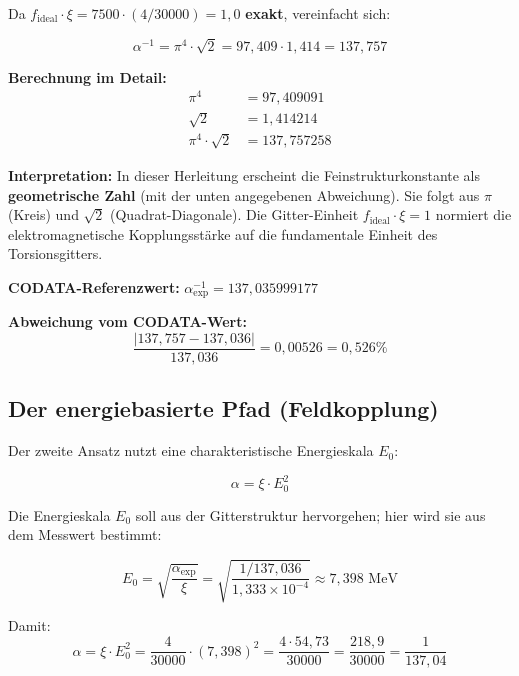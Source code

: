 	Da \(f_{\text{ideal}} \cdot \xi = 7500 \cdot (4/30000) = 1{,}0\) \textbf{exakt}, vereinfacht sich:
	
	\begin{equation}
		\alpha^{-1} = \pi^4 \cdot \sqrt{2} = 97{,}409 \cdot 1{,}414 = 137{,}757
	\end{equation}
	
	\textbf{Berechnung im Detail:}
	\begin{align}
		\pi^4 &= 97{,}409091 \\
		\sqrt{2} &= 1{,}414214 \\
		\pi^4 \cdot \sqrt{2} &= 137{,}757258
	\end{align}
	
	\textbf{Interpretation:} In dieser Herleitung erscheint die Feinstrukturkonstante als \textbf{geometrische Zahl} (mit der unten angegebenen Abweichung). Sie folgt aus \(\pi\) (Kreis) und \(\sqrt{2}\) (Quadrat-Diagonale). Die Gitter-Einheit \(f_{\text{ideal}} \cdot \xi = 1\) normiert die elektromagnetische Kopplungsstärke auf die fundamentale Einheit des Torsionsgitters.
	
	\textbf{CODATA-Referenzwert:} \(\alpha^{-1}_{\exp} = 137{,}035999177\)
	
	\textbf{Abweichung vom CODATA-Wert:}
	\begin{equation}
		\frac{|137{,}757 - 137{,}036|}{137{,}036} = 0{,}00526 = 0{,}526\%
	\end{equation}
	
	\subsection{Der energiebasierte Pfad (Feldkopplung)}
	
	Der zweite Ansatz nutzt eine charakteristische Energieskala \(E_0\):
	
	\begin{equation}
		\boxed{\alpha = \xi \cdot E_0^2}
	\end{equation}
	
	Die Energieskala \(E_0\) soll aus der Gitterstruktur hervorgehen; hier wird sie aus dem Messwert bestimmt:
	
	\begin{equation}
		E_0 = \sqrt{\frac{\alpha_{\exp}}{\xi}} = \sqrt{\frac{1/137{,}036}{1{,}333 \times 10^{-4}}} \approx 7{,}398 \text{ MeV}
	\end{equation}
	
	Damit:
	\begin{equation}
		\alpha = \xi \cdot E_0^2 = \frac{4}{30000} \cdot (7{,}398)^2 = \frac{4 \cdot 54{,}73}{30000} = \frac{218{,}9}{30000} = \frac{1}{137{,}04}
	\end{equation}
	
